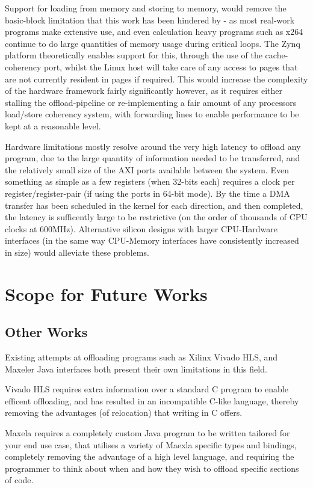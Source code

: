 \documentclass[a4paper]{article}
\begin{document}
Support for loading from memory and storing to memory, would remove the basic-block limitation that this work has been hindered by - as most real-work programs make extensive use, and even calculation heavy programs such as x264 continue to do large quantities of memory usage during critical loops. The Zynq platform theoretically enables support for this, through the use of the cache-coherency port, whilst the Linux host will take care of any access to pages that are not currently resident in pages if required. This would increase the complexity of the hardware framework fairly significantly however, as it requires either stalling the offload-pipeline or re-implementing a fair amount of any processors load/store coherency system, with forwarding lines to enable performance to be kept at a reasonable level.

Hardware limitations mostly resolve around the very high latency to offload any program, due to the large quantity of information needed to be transferred, and the relatively small size of the AXI ports available between the system. Even something as simple as a few registers (when 32-bits each) requires a clock per register/register-pair (if using the ports in 64-bit mode). By the time a DMA transfer has been scheduled in the kernel for each direction, and then completed, the latency is sufficently large to be restrictive (on the order of thousands of CPU clocks at 600MHz). Alternative silicon designs with larger CPU-Hardware interfaces (in the same way CPU-Memory interfaces have consistently increased in size) would alleviate these problems.

\section{Scope for Future Works}
\subsection{Other Works}
Existing attempts at offloading programs such as Xilinx Vivado HLS\cite{hls}, and Maxeler\cite{mf-fpga} Java interfaces both present their own limitations in this field.

Vivado HLS requires extra information over a standard C program to enable efficent offloading, and has resulted in an incompatible C-like language, thereby removing the advantages (of relocation) that writing in C offers.

Maxela requires a completely custom Java program to be written tailored for your end use case, that utilises a variety of Maexla specific types and bindings, completely removing the advantage of a high level language, and requiring the programmer to think about when and how they wish to offload specific sections of code.
\end{document}
